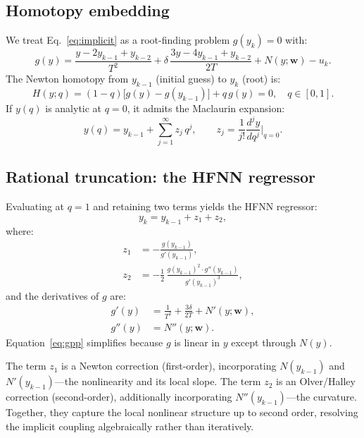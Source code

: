 \documentclass[preprint,12pt]{elsarticle}
\begin{document}
\subsection{Homotopy embedding}
\label{sec:homotopy}
We treat Eq.~\eqref{eq:implicit} as a root-finding problem $g(y_k) = 0$ with:
\begin{equation}
g(y) = \frac{y - 2y_{k-1} + y_{k-2}}{T^2} + \delta\,\frac{3y - 4y_{k-1} + y_{k-2}}{2T} + N(y;\mathbf{w}) - u_k.
\label{eq:g}
\end{equation}
The Newton homotopy from $y_{k-1}$ (initial guess) to $y_k$ (root) is:
\begin{equation}
H(y;q) = (1-q)\bigl[g(y) - g(y_{k-1})\bigr] + q\, g(y) = 0, \quad q \in [0,1].
\label{eq:homotopy}
\end{equation}
If $y(q)$ is analytic at $q=0$, it admits the Maclaurin expansion:
\begin{equation}
y(q) = y_{k-1} + \sum_{j=1}^{\infty} z_j\, q^j, \qquad z_j = \frac{1}{j!}\frac{d^j y}{dq^j}\bigg|_{q=0}.
\label{eq:maclaurin}
\end{equation}

\subsection{Rational truncation: the HFNN regressor}
\label{sec:regressor}
Evaluating at $q=1$ and retaining two terms yields the HFNN regressor:
\begin{equation}
\boxed{y_k = y_{k-1} + z_1 + z_2,}
\label{eq:regressor}
\end{equation}
where:
\begin{align}
z_1 &= -\frac{g(y_{k-1})}{g'(y_{k-1})}, \label{eq:z1}\\[4pt]
z_2 &= -\frac{1}{2}\,\frac{g(y_{k-1})^2 \cdot g''(y_{k-1})}{g'(y_{k-1})^3}, \label{eq:z2}
\end{align}
and the derivatives of $g$ are:
\begin{align}
g'(y) &= \frac{1}{T^2} + \frac{3\delta}{2T} + N'(y;\mathbf{w}), \label{eq:gp}\\[4pt]
g''(y) &= N''(y;\mathbf{w}). \label{eq:gpp}
\end{align}
Equation~\eqref{eq:gpp} simplifies because $g$ is linear in $y$ except through $N(y)$.

The term $z_1$ is a Newton correction (first-order), incorporating $N(y_{k-1})$ and $N'(y_{k-1})$---the nonlinearity and its local slope. The term $z_2$ is an Olver/Halley correction (second-order), additionally incorporating $N''(y_{k-1})$---the curvature. Together, they capture the local nonlinear structure up to second order, resolving the implicit coupling algebraically rather than iteratively.
\end{document}
